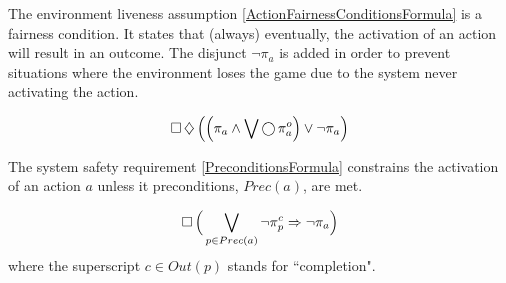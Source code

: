 The environment liveness assumption \eqref{ActionFairnessConditionsFormula} is a fairness condition.
It states that (always) eventually, the activation of an action will result in an outcome.
The disjunct $\lnot \pi_a$ is added in order to prevent situations where the environment loses the game due to the system never activating the action.


\begin{equation}\label{ActionFairnessConditionsFormula}
	\operatorname{\Box} \operatorname{\diamondsuit} \Big( \Big( \pi_a \wedge \bigvee \operatorname{\bigcirc} \pi_a^o \Big) \vee \lnot \pi_a \Big)
\end{equation}

The system safety requirement \eqref{PreconditionsFormula} constrains the activation of an action $a$ unless it preconditions, $Prec(a)$, are met.

\begin{equation}\label{PreconditionsFormula}
	\operatorname{\Box} \Big( \bigvee \limits_{p \in Prec(a)} \lnot \pi_p^c \Rightarrow \lnot \pi_a \Big)
\end{equation}
where the superscript $c \in Out(p)$ stands for ``completion".


